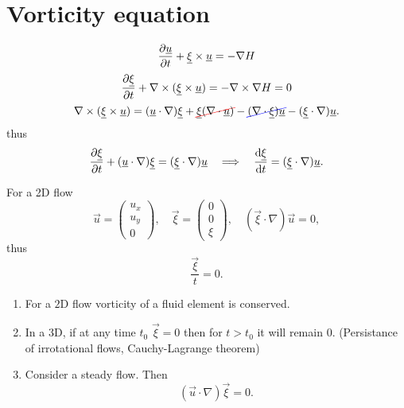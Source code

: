 \documentclass[../main.tex]{subfiles}
\begin{document}
  \section{Vorticity equation}
  \begin{displaymath}
    \frac{\partial \underline{u}}{\partial t} + \underline{\xi} \times \underline{u} = - \nabla H
  \end{displaymath}
  \begin{displaymath}
    \frac{\partial \underline{\xi}}{\partial t} + \nabla \times (\underline{\xi} \times \underline{u}) = - \nabla \times \nabla H = 0
  \end{displaymath}
  \begin{displaymath}
    \nabla \times(\vec \xi \times\vec u )  = (\vec u \cdot \nabla) \vec \xi + 
    \Ccancel[red]{\vec \xi (\nabla \cdot \vec u)} - \Ccancel[blue]{(\nabla \cdot \vec \xi) \vec u} - (\vec \xi \cdot \nabla ) \vec u.
  \end{displaymath}
  thus
  \begin{displaymath}
    \frac{\partial \underline{\xi}}{\partial t} + (\underline{u}\cdot \nabla ) \underline{\xi} = (\underline{\xi} \cdot \nabla)\underline{u} 
    \quad \Longrightarrow \quad \frac{\mathrm{d} \underline{\xi}}{\mathrm{d} t} = (\underline{\xi} \cdot \nabla) \underline{u}.
  \end{displaymath}

  For a 2D flow
  \begin{displaymath}
    \vec u = \begin{pmatrix}
      u_x\\
      u_y\\
      0
    \end{pmatrix}, \quad 
    \vec \xi = \begin{pmatrix}
      0\\
      0\\
      \xi
    \end{pmatrix}, \quad (\vec \xi \cdot \nabla) \vec u = 0, 
  \end{displaymath}
  thus
  \begin{displaymath}
    \dfrac{\vec \xi}{t} = 0.
  \end{displaymath}

  \begin{enumerate}
    \item For a $2$D flow vorticity of a fluid element is conserved.
    \item In a 3D, if at any time $t_0$ $\vec \xi =0$ then for $t> t_0$ it will remain $0$.
      (Persistance of irrotational flows, Cauchy-Lagrange theorem)
    \item Consider a steady flow. Then 
      \begin{displaymath}
        (\vec u \cdot \nabla) \vec \xi = 0.
      \end{displaymath}
      
  \end{enumerate}
\end{document}
